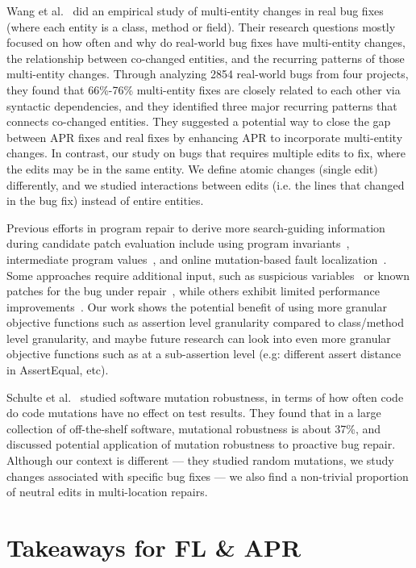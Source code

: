 \documentclass[sigconf, timestamp-false, anonymous=true]{acmart}
\begin{document}
Wang et al.~\cite{wang2018} did an empirical study of multi-entity changes in real bug fixes 
(where each entity is a class, method or field). Their research questions mostly focused on 
how often and why do real-world bug fixes have multi-entity changes, the relationship 
between co-changed entities, and the recurring patterns of those multi-entity changes. 
Through analyzing 2854 real-world bugs from four projects, they found that 66\%-76\% 
multi-entity fixes are closely related to each other via syntactic dependencies, 
and they identified three major recurring patterns that connects co-changed entities. 
They suggested a potential way to close the gap between APR fixes and real fixes by 
enhancing APR to incorporate multi-entity changes. In contrast, our study on bugs that
requires multiple edits to fix, where the edits may be in the same entity. We define atomic 
changes (single edit) differently, and we studied interactions between edits 
(i.e. the lines that changed in the bug fix) instead of entire entities.

Previous efforts in program repair to derive more search-guiding information 
during candidate patch evaluation 
include using program invariants~\cite{better-fitness, dinglyu}, 
intermediate program values~\cite{source-code-checkpoint}, 
and online mutation-based fault localization~\cite{mut-analysis}.
Some approaches require additional input, such as suspicious variables~\cite{source-code-checkpoint} 
or known patches for the bug under repair~\cite{better-fitness}, 
while others exhibit limited performance improvements~\cite{dinglyu, mut-analysis}.
Our work shows the potential benefit of using more granular objective functions such as
assertion level granularity compared to class/method level granularity, and maybe
future research can look into even more granular objective functions such as at a sub-assertion
level (e.g: different assert distance in AssertEqual, etc).

Schulte et al.~\cite{schulte} studied software mutation robustness, in terms of 
how often code do code mutations have no effect on test results.
They found that in a large collection of off-the-shelf software, mutational robustness is about 37\%, 
and discussed potential application of mutation robustness to proactive bug repair. Although our context is different --- they studied random mutations, we study changes associated with specific bug fixes --- we also find a non-trivial proportion of neutral edits in multi-location repairs.  


\section{Takeaways for FL \& APR}
\label{sec:takeaways}
\end{document}
